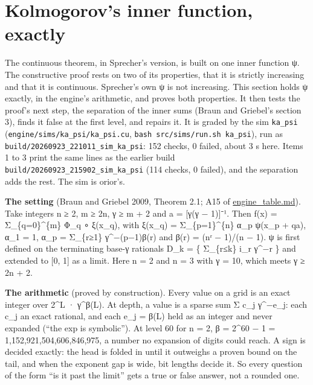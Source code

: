 \section{\texorpdfstring{Kolmogorov's inner function, exactly}{Kolmogorov's inner function, exactly}}

The continuous theorem, in Sprecher's version, is built on one inner function ψ. The constructive proof rests on two of its properties, that it is strictly increasing and that it is continuous. Sprecher's own ψ is not increasing. This section holds ψ exactly, in the engine's arithmetic, and proves both properties. It then tests the proof's next step, the separation of the inner sums (Braun and Griebel's section 3), finds it false at the first level, and repairs it. It is graded by the sim \texttt{ka\_\allowbreak{}psi} (\texttt{engine/\allowbreak{}sims/\allowbreak{}ka\_\allowbreak{}psi/\allowbreak{}ka\_\allowbreak{}psi.\allowbreak{}cu}, \texttt{bash src/\allowbreak{}sims/\allowbreak{}run.\allowbreak{}sh ka\_\allowbreak{}psi}), run as \texttt{build/\allowbreak{}20260923\_\allowbreak{}221011\_\allowbreak{}sim\_\allowbreak{}ka\_\allowbreak{}psi}: 152 checks, 0 failed, about 3 s here. Items 1 to 3 print the same lines as the earlier build \texttt{build/\allowbreak{}20260923\_\allowbreak{}215902\_\allowbreak{}sim\_\allowbreak{}ka\_\allowbreak{}psi} (114 checks, 0 failed), and the separation adds the rest. The sim is orior's.

\textbf{The setting} (Braun and Griebel 2009, Theorem 2.1; A15 of \hyperref[chap:engine-table]{engine\_\allowbreak{}table.md}). Take integers n ≥ 2, m ≥ 2n, γ ≥ m + 2 and a = [γ(γ − 1)]⁻¹. Then f(x) = Σ\_\allowbreak{}\{q=0\}\textasciicircum{}\{m\} Φ\_\allowbreak{}q ∘ ξ(x\_\allowbreak{}q), with ξ(x\_\allowbreak{}q) = Σ\_\allowbreak{}\{p=1\}\textasciicircum{}\{n\} α\_\allowbreak{}p ψ(x\_\allowbreak{}p + qa), α\_\allowbreak{}1 = 1, α\_\allowbreak{}p = Σ\_\allowbreak{}\{r≥1\} γ\textasciicircum{}−(p−1)β(r) and β(r) = (nʳ − 1)/(n − 1). ψ is first defined on the terminating base-γ rationals D\_\allowbreak{}k = \{ Σ\_\allowbreak{}\{r≤k\} i\_\allowbreak{}r γ\textasciicircum{}−r \} and extended to [0, 1] as a limit. Here n = 2 and n = 3 with γ = 10, which meets γ ≥ 2n + 2.

\textbf{The arithmetic} (proved by construction). Every value on a grid is an exact integer over 2\textasciicircum{}L · γ\textasciicircum{}β(L). At depth, a value is a sparse sum Σ c\_\allowbreak{}j γ\textasciicircum{}−e\_\allowbreak{}j: each c\_\allowbreak{}j an exact rational, and each e\_\allowbreak{}j = β(L) held as an integer and never expanded (“the exp is symbolic”). At level 60 for n = 2, β = 2\textasciicircum{}60 − 1 = 1,152,921,504,606,846,975, a number no expansion of digits could reach. A sign is decided exactly: the head is folded in until it outweighs a proven bound on the tail, and when the exponent gap is wide, bit lengths decide it. So every question of the form “is it past the limit” gets a true or false answer, not a rounded one.

